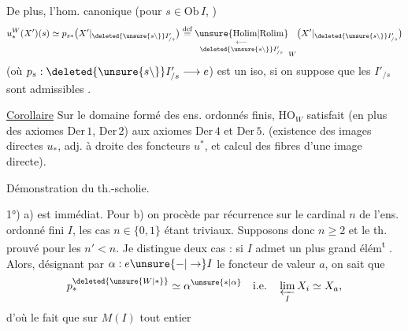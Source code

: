 De plus, l'hom. canonique (pour $s\in\mathrm{Ob}\,I$, )
\[
u_*^W(X')(s)\simeq p_{s*}\bigl(X'|_{\deleted{\unsure{s\backslash}}I'_{/s}}\bigr)
\overset{\text{def}}{=}
\underset{\deleted{\unsure{s\backslash}}I'_{/s}}{\underset{\longleftarrow}{\operatorname{\unsure{Holim|Rolim}}}}_W\bigl(X'|_{\deleted{\unsure{s\backslash}}I'_{/s}}\bigr)
\]
(où $p_s:\deleted{\unsure{s\backslash}}I'_{/s}\longrightarrow e$) est un iso, si on suppose que les $I'_{/s}$ sont admissibles  .

\uline{Corollaire} Sur le domaine formé des ens. ordonnés finis,  $\mathrm{HO}_W$ satisfait (en plus des axiomes $\mathrm{Der}\,1$, $\mathrm{Der}\,2$) aux axiomes $\mathrm{Der}\,4$ et $\mathrm{Der}\,5$. (existence des images directes $u_*$, adj. à droite des foncteurs $u^*$, et calcul  des fibres d'une image directe).

Démonstration du th.-scholie.

1°) a) est immédiat. Pour b) on procède par récurrence sur le cardinal $n$ de l'ens. ordonné fini $I$, les cas $n\in\{0,1\}$ étant triviaux. Supposons donc $n\geq2$ et le th. prouvé pour les $n'<n$. Je distingue deux cas : si $I$ admet un plus grand élém\textsuperscript{t} . Alors, désignant par $\alpha:e\unsure{-|\to}I$ le foncteur de valeur $a$,  on sait que
\[
p_*^{\deleted{\unsure{W|*}}}\simeq\alpha^{\unsure{*|\alpha}}\quad\text{i.e.}\quad\varprojlim_I X_i\simeq X_a,
\]
d'où le fait que sur $M(I)$ tout entier
